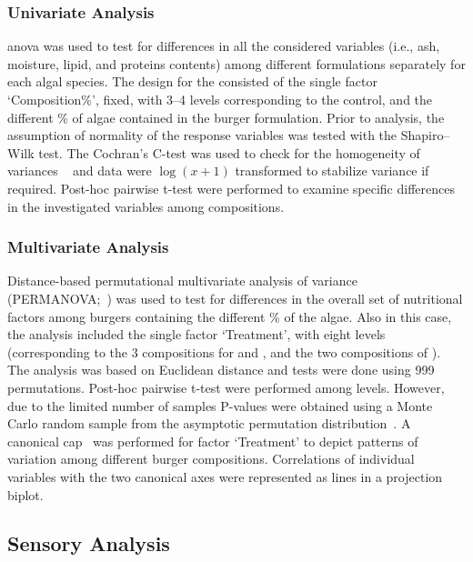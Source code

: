 \subsubsection{Univariate Analysis}
\Gls{anova} was used to test for differences in all the considered variables (i.e., ash, moisture, lipid, and proteins contents) among different formulations separately for each algal species. The design for the consisted of the single factor ‘Composition\%’, fixed, with \numrange[range-phrase={--}]{3}{4} levels corresponding to the control, and the different \%\zxriv{} of algae contained in the burger formulation. Prior to analysis, the assumption of normality of the response variables was tested with the Shapiro–Wilk test. The Cochran’s C-test was used to check for the homogeneity of variances ~\parencite{underwood_Experiments_1996} and data were $ \log(x + 1) $ transformed to stabilize variance if required. Post-hoc pairwise t-test were performed to examine specific differences in the investigated variables among compositions.

\subsubsection{Multivariate Analysis}
Distance-based permutational multivariate analysis of variance (PERMANOVA;~\cite{anderson_new_2001}) was used to test for differences in the overall set of nutritional factors among burgers containing the different \% of the algae. Also in this case, the analysis included the single factor ‘Treatment’, with eight levels (corresponding to the \num{3} compositions for  and , and the two compositions of ). The analysis was based on Euclidean distance and tests were done using \num{999} permutations. Post-hoc pairwise t-test were performed among levels. However, due to the limited number of samples P-values were obtained using a Monte Carlo random sample from the asymptotic permutation distribution~\parencite{anderson_Generalized_2003}. A canonical \gls{cap}~\parencite{anderson_CANONICAL_2003} was performed for factor ‘Treatment’ to depict patterns of variation among different burger compositions. Correlations of individual variables with the two canonical axes were represented as lines in a projection biplot.

\subsection{Sensory Analysis}

